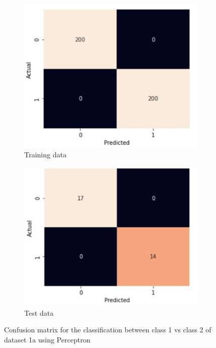 \documentclass[11pt]{article}
\begin{document}
\begin{figure}
\centering
	\begin{subfigure}[b]{0.45\textwidth}
	\centering
	\includegraphics[scale=0.4]{dataset1a_perceptron_12_cm_train.jpg}
	\caption{Training data}
	\label{fig:fig1.1.4.1}
	\end{subfigure}
	\begin{subfigure}[b]{0.45\textwidth}
	\centering
	\includegraphics[scale=0.4]{dataset1a_perceptron_12_cm_test.jpg}
	\caption{Test data}
	\label{fig:fig1.1.4.2}
	\end{subfigure}
\caption{Confusion matrix for the classification between class 1 vs class 2 of dataset 1a using Perceptron}
\label{fig:fig1.1.4}
\end{figure}
\end{document}
